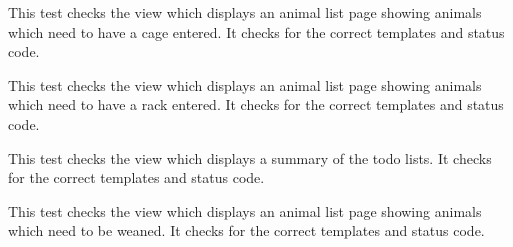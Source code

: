 \documentclass[letterpaper,10pt,english]{sphinxmanual}
\begin{document}
\begin{fulllineitems}
\begin{fulllineitems}
\end{fulllineitems}


\begin{fulllineitems}
\label{api:mousedb.animal.tests.ToDoViewTests.test_no_cage_list}
This test checks the view which displays an animal list page showing animals which need to have a cage entered.  It checks for the correct templates and status code.

\end{fulllineitems}


\begin{fulllineitems}
\label{api:mousedb.animal.tests.ToDoViewTests.test_no_rack_list}
This test checks the view which displays an animal list page showing animals which need to have a rack entered.  It checks for the correct templates and status code.

\end{fulllineitems}


\begin{fulllineitems}
\label{api:mousedb.animal.tests.ToDoViewTests.test_todo_home}
This test checks the view which displays a summary of the todo lists.  It checks for the correct templates and status code.

\end{fulllineitems}


\begin{fulllineitems}
\label{api:mousedb.animal.tests.ToDoViewTests.test_wean_list}
This test checks the view which displays an animal list page showing animals which need to be weaned.  It checks for the correct templates and status code.

\end{fulllineitems}


\end{fulllineitems}
\end{document}
